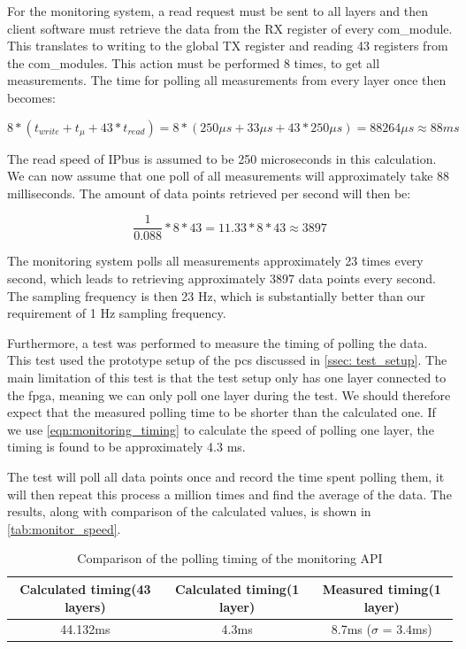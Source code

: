 \documentclass[main.tex]{subfiles}
\begin{document}
 For the monitoring system, a read request must be sent to all layers and then client software must retrieve the data from the RX register of every com\_module. This translates to writing to the global TX register and reading 43 registers from the com\_modules. This action must be performed 8 times, to get all measurements. The time for polling all measurements from every layer once then becomes:

\begin{equation} \label{eqn:monitoring_timing}
8*(t_{write}+t_{\mu } + 43*t_{read}) = 8*(250\mu s + 33 \mu s + 43*250\mu s) = 88264 \mu s \approx 88 ms
\end{equation}

The read speed of IPbus is assumed to be 250 microseconds in this calculation. We can now assume that one poll of all measurements will approximately take 88 milliseconds. The amount of data points retrieved per second will then be:

\begin{equation} \label{eqn:data_points_per_second}
\frac{1}{0.088}*8*43 =  11.33 * 8*43 \approx 3897
\end{equation}

The monitoring system polls all measurements approximately 23 times every second, which leads to retrieving approximately 3897 data points every second. The sampling frequency is then 23 Hz,  which is substantially better than our requirement of 1 Hz sampling frequency.

Furthermore, a test was performed to measure the timing of polling the data. This test used the prototype setup of the \gls{pcs} discussed in \autoref{ssec: test_setup}. The main limitation of this test is that the test setup only has one layer connected to the \gls{fpga}, meaning we can only poll one layer during the test. We should therefore expect that the measured polling time to be shorter than the calculated one. If we use \autoref{eqn:monitoring_timing} to calculate the speed of polling one layer, the timing is found to be approximately 4.3 ms.

The test will poll all data points once and record the time spent polling them, it will then repeat this process a million times and find the average of the data. The results, along with comparison of the calculated values, is shown in \autoref{tab:monitor_speed}.

\begin{table}[h]
\centering
\begin{tabular}{||c c c||} 
 \hline
  Calculated timing(43 layers) & Calculated timing(1 layer) & Measured timing(1 layer) \\ [0.5ex] 
 \hline\hline
    44.132ms & 4.3ms & 8.7ms ($\sigma$ = 3.4ms) \\  [1ex] 
 \hline
\end{tabular}
\caption{\label{tab:monitor_speed} Comparison of the polling timing of the monitoring API}
\end{table}
\FloatBarrier
\end{document}
